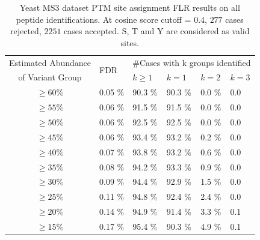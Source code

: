 \begin{table}[h]
  \centering
  \caption{Yeast MS3 dataset PTM site assignment FLR results on all peptide identifications. At cosine score cutoff = $0.4$, $277$ cases rejected, $2251$ cases accepted. S, T and Y are considered as valid sites.}\label{tbl:YeastFLR_all_STY}
\begin{tabular}{|c|l|l|l|l|l|}
\hline
Estimated Abundance & \multirow{2}{*}{FDR} & \multicolumn{4}{|c|}{\#Cases with k groups identified }\\
of Variant Group & & $k\ge 1$ & $k=1$ & $k=2$ & $k=3$\\
\hline
$\ge	60	\%$ &	0.05	\% &	90.3	\% &	90.3	\% &	0.0	\% &	0.0	\\
$\ge	55	\%$ &	0.06	\% &	91.5	\% &	91.5	\% &	0.0	\% &	0.0	\\
$\ge	50	\%$ &	0.06	\% &	92.5	\% &	92.5	\% &	0.0	\% &	0.0	\\
$\ge	45	\%$ &	0.06	\% &	93.4	\% &	93.2	\% &	0.2	\% &	0.0	\\
$\ge	40	\%$ &	0.07	\% &	93.8	\% &	93.2	\% &	0.6	\% &	0.0	\\
$\ge	35	\%$ &	0.08	\% &	94.2	\% &	93.3	\% &	0.9	\% &	0.0	\\
$\ge	30	\%$ &	0.09	\% &	94.4	\% &	92.9	\% &	1.5	\% &	0.0	\\
$\ge	25	\%$ &	0.11	\% &	94.8	\% &	92.4	\% &	2.4	\% &	0.0	\\
$\ge	20	\%$ &	0.14	\% &	94.9	\% &	91.4	\% &	3.3	\% &	0.1	\\
$\ge	15	\%$ &	0.17	\% &	95.4	\% &	90.3	\% &	4.9	\% &	0.1	\\

\hline
\end{tabular}
\end{table}

